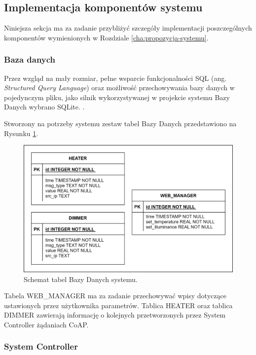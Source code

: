     \subsection{Implementacja komponentów systemu}

        Niniejsza sekcja ma za zadanie przybliżyć szczegóły implementacji poszczególnych komponentów wymienionych w Rozdziale \ref{cha:propozycja-systemu}.

        \subsubsection{Baza danych}
            Przez wzgląd na mały rozmiar, pełne wsparcie funkcjonalności SQL (ang. \textit{Structured Query Language}) oraz możliwość przechowywania bazy danych w pojedynczym pliku, jako silnik wykorzystywanej w projekcie systemu Bazy Danych wybrano SQLite. \cite{sqlite}.

            Stworzony na potrzeby systemu zestaw tabel Bazy Danych przedstawiono na Rysunku \ref{fig:db-diagram}.

            \begin{figure}[H]
                \centering
                \includegraphics[width=0.8\linewidth]{graphics/db_diagram.png}
                \caption{Schemat tabel Bazy Danych systemu.}
                \label{fig:db-diagram}
            \end{figure}

            Tabela WEB\_MANAGER ma za zadanie przechowywać wpisy dotyczące ustawionych przez użytkownika parametrów. Tablica HEATER oraz tablica DIMMER zawierają informację o kolejnych przetworzonych przez System Controller żądaniach CoAP.
    
        \subsubsection{System Controller}
    

